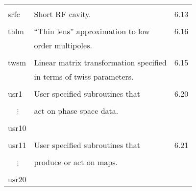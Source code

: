 \begin{center}
\begin{tabular}{lll}
\vspace{-3mm}& &\\
\hspace{1.5em}srfc    &         Short RF cavity.                     &  \hspace{2em}6.13\\
\vspace{-3mm}& &\\
\hspace{1.5em}thlm    &         ``Thin lens'' approximation to low    &\hspace{2em}6.16\\
               &         order multipoles.                    &      \\
\vspace{-3mm}& &\\
\hspace{1.5em}twsm    &      Linear matrix transformation specified &  \hspace{2em}6.15\\
               &         in terms of twiss parameters.        &      \\
\vspace{-3mm}& &\\
\hspace{1.5em}usr1    &         User specified subroutines that     &  \hspace{2em}6.20\\
\vspace{-7mm}& &\\
\hspace{1.5em}\ \ \,$\vdots$ &         act on phase space data.             &      \\
\vspace{-7mm}& &\\
\hspace{1.5em}usr10    &                                             &      \\
\vspace{-3mm}& &\\
\hspace{1.5em}usr11    &         User specified subroutines that     &  \hspace{2em}6.21\\
\vspace{-7mm}& &\\
\hspace{1.5em}\ \ \,$\vdots$ &         produce or act on maps.              &      \\
\vspace{-7mm}& &\\
\hspace{1.5em}usr20    &                                             &
\end{tabular}
\end{center}

